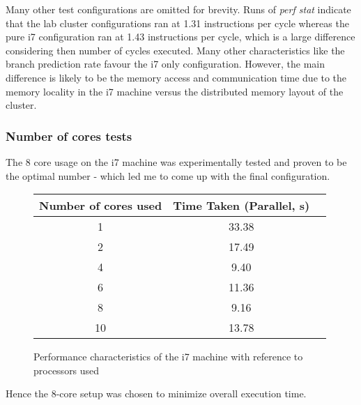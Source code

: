 \documentclass[12pt,a4paper]{article}
\begin{document}
Many other test configurations are omitted for brevity. Runs of \textit{perf stat} indicate that the lab cluster configurations ran at 1.31 instructions per cycle whereas the pure i7 configuration ran at 1.43 instructions per cycle, which is a large difference considering then number of cycles executed. Many other characteristics like the branch prediction rate favour the i7 only configuration. However, the main difference is likely to be the memory access and communication time due to the memory locality in the i7 machine versus the distributed memory layout of the cluster. \\

\newpage

\subsubsection{Number of cores tests}


The 8 core usage on the i7 machine was experimentally tested and proven to be the optimal number - which led me to come up with the final configuration.  

\begin{figure}[h]
\begin{center}
\begin{tabular}{ |c|c|c| } 
 \hline
Number of cores used & Time Taken (Parallel, s) \\
\hline
1 & 33.38 \\
2 & 17.49\\
4 & 9.40 \\
6 & 11.36 \\
8 & 9.16  \\
10 & 13.78\\

 \hline
\end{tabular}
\end{center}
\caption{Performance characteristics of the i7 machine with reference to processors used}
\end{figure}

Hence the 8-core setup was chosen to minimize overall execution time.
\end{document}
